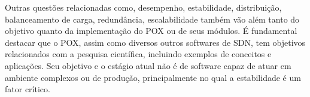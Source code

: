 Outras questões relacionadas como, desempenho, estabilidade,
distribuição, balanceamento de carga, redundância, 
escalabilidade também vão além tanto do objetivo quanto da
implementação do POX ou de seus módulos.
É fundamental destacar que o POX, 
assim como diversos outros softwares de SDN, 
tem objetivos relacionados com a pesquisa científica, 
incluindo exemplos de conceitos e aplicações.
Seu objetivo e o estágio atual não é de software 
capaz de atuar em ambiente complexos ou de produção,
principalmente no qual a estabilidade é um fator crítico.
